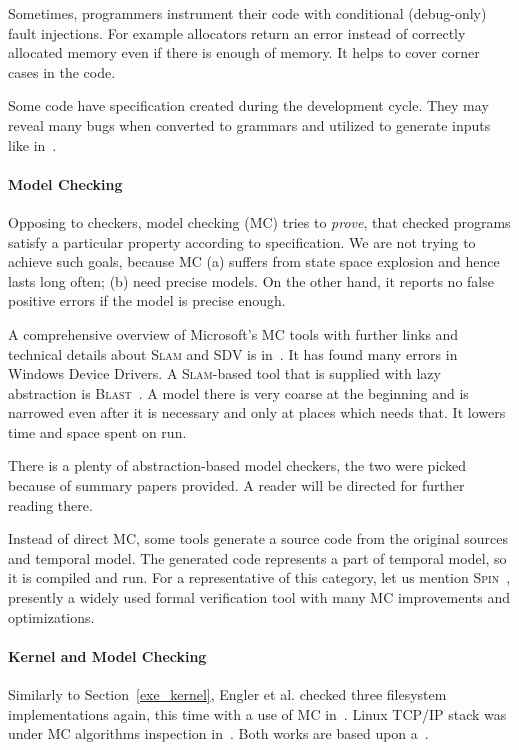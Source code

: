 \documentclass[11pt,a4paper]{article}
\begin{document}
Sometimes, programmers instrument their code with conditional (debug-only)
fault injections. For example allocators return an error instead of correctly
allocated memory even if there is enough of memory. It helps to cover corner
cases in the code.

Some code have specification created during the development cycle. They may
reveal many bugs when converted to grammars and utilized to generate inputs
like in~\cite{grammar1,grammar2,grammar3}.

\paragraph{Model Checking} Opposing to checkers, model checking (MC) tries
to \emph{prove}, that checked programs satisfy a particular property according
to specification. We are not trying to achieve such goals, because MC (a)
suffers from state space explosion and hence lasts long often; (b) need
precise models. On the other hand, it reports no false positive errors if the
model is precise enough.

A comprehensive overview of Microsoft's MC tools with further links and
technical details about \textsc{Slam} and \textsc{SDV} is in~\cite{slam}. It
has found many errors in Windows Device Drivers. A \textsc{Slam}-based tool
that is supplied with lazy abstraction is \textsc{Blast}~\cite{blast}. A model
there is very coarse at the beginning and is narrowed even after it is
necessary and only at places which needs that. It lowers time and space spent
on run.

There is a plenty of abstraction-based model checkers, the two were picked
because of summary papers provided. A reader will be directed for further
reading there.

Instead of direct MC, some tools generate a source code from the original
sources and temporal model. The generated code represents a part of temporal
model, so it is compiled and run. For a representative of this category, let
us mention \textsc{Spin}~\cite{spin}, presently a widely used formal
verification tool with many MC improvements and optimizations.

\paragraph{Kernel and Model Checking} \label{mc_kernel} Similarly to
Section~\ref{exe_kernel}, Engler et al. checked three filesystem
implementations again, this time with a use of MC in~\cite{mc_kernel_fs}.
Linux TCP/IP stack was under MC algorithms inspection in~\cite{mc_kernel_ip}.
Both works are based upon a~\cite{cmc}.
\end{document}
